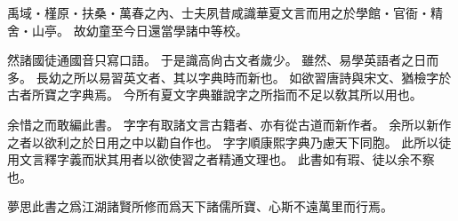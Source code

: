禹域・槿原・扶桑・萬春之內、士夫夙昔咸識華夏文言而用之於學館・官衙・精舍・山亭。
故幼童至今日還當學諸中等校。

然諸國徒通國音只寫口語。
于是識高尙古文者歲少。
雖然、易學英語者之日而多。
長幼之所以易習英文者、其以字典時而新也。
如欲習唐詩與宋文、猶檢字於古者所寶之字典焉。
今所有夏文字典雖說字之所指而不足以敎其所以用也。

余惜之而敢編此書。
字字有取諸文言古籍者、亦有從古道而新作者。
余所以新作之者以欲利之於日用之中以勸自作也。
字字順康熙字典乃慮天下同胞。
此所以徒用文言釋字義而狀其用者以欲使習之者精通文理也。
此書如有瑕、徒以余不察也。

夢思此書之爲江湖諸賢所修而爲天下諸儒所寶、心斯不遠萬里而行焉。
